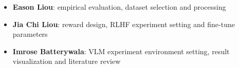 \begin{itemize}
\item \textbf{Eason Liou}: empirical evaluation, dataset selection and processing
\item \textbf{Jia Chi Liou}: reward design, RLHF experiment setting and fine-tune parameters
\item \textbf{Imrose Batterywala}: VLM experiment environment setting, result visualization and literature review

\end{itemize}



